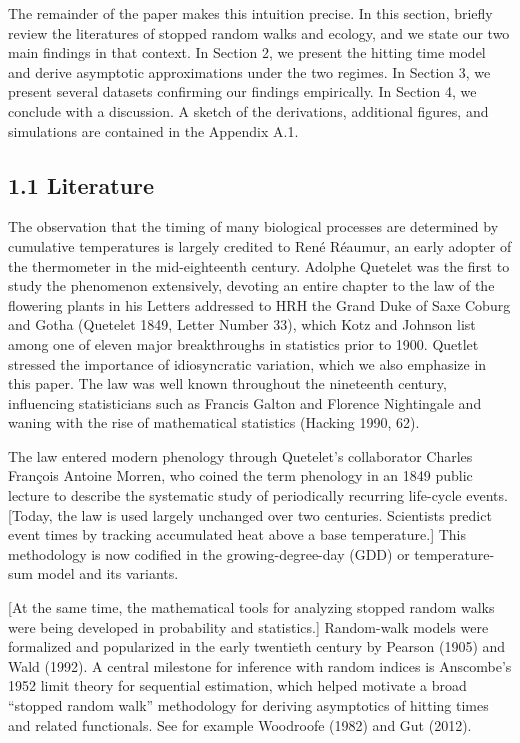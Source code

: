 
The remainder of the paper makes this intuition precise. In this
section, briefly review the literatures of stopped random walks and
ecology, and we state our two main findings in that context. In Section
2, we present the hitting time model and derive asymptotic
approximations under the two regimes. In Section 3, we present several
datasets confirming our findings empirically. In Section 4, we conclude
with a discussion. A sketch of the derivations, additional figures, and
simulations are contained in the Appendix A.1.

\subsection{1.1 Literature}\label{literature}

The observation that the timing of many biological processes are
determined by cumulative temperatures is largely credited to René
Réaumur, an early adopter of the thermometer in the mid-eighteenth
century. Adolphe Quetelet was the first to study the phenomenon
extensively, devoting an entire chapter to the law of the flowering
plants in his Letters addressed to HRH the Grand Duke of Saxe Coburg and
Gotha (Quetelet 1849, Letter Number 33), which Kotz and Johnson list
among one of eleven major breakthroughs in statistics prior to 1900.
Quetlet stressed the importance of idiosyncratic variation, which we
also emphasize in this paper. The law was well known throughout the
nineteenth century, influencing statisticians such as Francis Galton and
Florence Nightingale and waning with the rise of mathematical statistics
(Hacking 1990, 62). 

The law entered modern phenology through Quetelet's collaborator Charles
Fran\c{c}ois Antoine Morren, who coined the term phenology in an 1849
public lecture to describe the systematic study of periodically
recurring life-cycle events. [Today, the law is used largely unchanged
over two centuries. Scientists predict event times by tracking
accumulated heat above a base temperature.] This methodology is now
codified in the growing-degree-day (GDD) or temperature-sum model and
its variants.

[At the same time, the mathematical tools for analyzing stopped random
walks were being developed in probability and statistics.] Random-walk
models were formalized and popularized in the early twentieth century by
Pearson (1905) and Wald (1992). A central milestone for inference with
random indices is Anscombe's 1952 limit theory for sequential
estimation, which helped motivate a broad ``stopped random walk''
methodology for deriving asymptotics of hitting times and related
functionals. See for example Woodroofe (1982) and Gut (2012).

